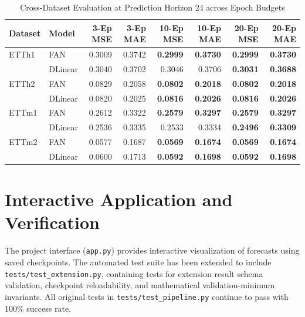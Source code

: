 \documentclass[conference,10pt]{IEEEtran}
\begin{document}
\begin{table}[t]
\caption{Cross-Dataset Evaluation at Prediction Horizon 24 across Epoch Budgets}
\label{tab:extension_h24}
\centering
\footnotesize
\begin{tabular}{@{}llrrrrrr@{}}
\toprule
Dataset & Model & 3-Ep MSE & 3-Ep MAE & 10-Ep MSE & 10-Ep MAE & 20-Ep MSE & 20-Ep MAE\\
\midrule
ETTh1 & FAN & 0.3009 & 0.3742 & \textbf{0.2999} & \textbf{0.3730} & \textbf{0.2999} & \textbf{0.3730}\\
      & DLinear & 0.3040 & 0.3702 & 0.3046 & 0.3706 & \textbf{0.3031} & \textbf{0.3688}\\
\midrule
ETTh2 & FAN & 0.0829 & 0.2058 & \textbf{0.0802} & \textbf{0.2018} & \textbf{0.0802} & \textbf{0.2018}\\
      & DLinear & 0.0820 & 0.2025 & \textbf{0.0816} & \textbf{0.2026} & \textbf{0.0816} & \textbf{0.2026}\\
\midrule
ETTm1 & FAN & 0.2612 & 0.3322 & \textbf{0.2579} & \textbf{0.3297} & \textbf{0.2579} & \textbf{0.3297}\\
      & DLinear & 0.2536 & 0.3335 & 0.2533 & 0.3334 & \textbf{0.2496} & \textbf{0.3309}\\
\midrule
ETTm2 & FAN & 0.0577 & 0.1687 & \textbf{0.0569} & \textbf{0.1674} & \textbf{0.0569} & \textbf{0.1674}\\
      & DLinear & 0.0600 & 0.1713 & \textbf{0.0592} & \textbf{0.1698} & \textbf{0.0592} & \textbf{0.1698}\\
\bottomrule
\end{tabular}
\end{table}

\section{Interactive Application and Verification}
The project interface (\texttt{app.py}) provides interactive visualization of forecasts using saved checkpoints. The automated test suite has been extended to include \texttt{tests/test\_extension.py}, containing tests for extension result schema validation, checkpoint reloadability, and mathematical validation-minimum invariants. All original tests in \texttt{tests/test\_pipeline.py} continue to pass with 100\% success rate.
\end{document}
